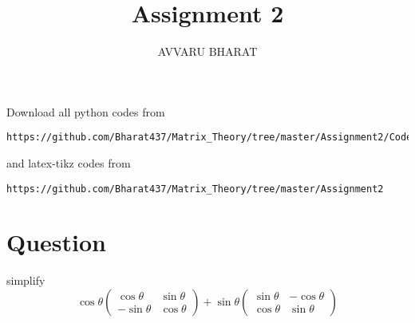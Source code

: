 \documentclass[journal,12pt,twocolumn]{IEEEtran}
\begin{document}
     \def\rightbox#1{\makebox[0in][r]{#1}}
     \def\centbox#1{\makebox[0in]{#1}}
     \def\topbox#1{\raisebox{-\baselineskip}[0in][0in]{#1}}
     \def\midbox#1{\raisebox{-0.5\baselineskip}[0in][0in]{#1}}
\vspace{3cm}
\title{Assignment 2}
\author{AVVARU BHARAT}
\maketitle
\newpage
\bigskip
\renewcommand{\thefigure}{1}
\renewcommand{\thetable}{\theenumi}
Download all python codes from 
\begin{lstlisting}
https://github.com/Bharat437/Matrix_Theory/tree/master/Assignment2/Codes
\end{lstlisting}
%
and latex-tikz codes from 
%
\begin{lstlisting}
https://github.com/Bharat437/Matrix_Theory/tree/master/Assignment2
\end{lstlisting}
\section{\textbf{Question}}
simplify \begin{equation}
    \cos\theta\left(\begin{array}{cc}\cos\theta & \sin\theta \\ -\sin\theta & \cos\theta\end{array}\right)+\sin\theta\left(\begin{array}{cc}\sin\theta & -\cos\theta \\ \cos\theta & \sin\theta\end{array}\right)\nonumber
\end{equation}
\end{document}
